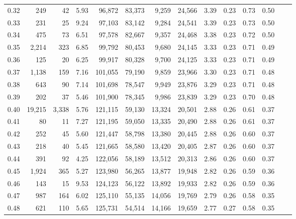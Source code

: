 \begin{tabular}{rrrrrrrrrrrrrr}
0.32 &     249 &     42 &    5.93 &   96,872 &   83,373 &   9,259 &  24,566 &  3.39 &  0.23 &  0.73 &      0.50 \\
0.33 &     231 &     25 &    9.24 &   97,103 &   83,142 &   9,284 &  24,541 &  3.39 &  0.23 &  0.73 &      0.50 \\
0.34 &     475 &     73 &    6.51 &   97,578 &   82,667 &   9,357 &  24,468 &  3.38 &  0.23 &  0.72 &      0.50 \\
0.35 &   2,214 &    323 &    6.85 &   99,792 &   80,453 &   9,680 &  24,145 &  3.33 &  0.23 &  0.71 &      0.49 \\
0.36 &     125 &     20 &    6.25 &   99,917 &   80,328 &   9,700 &  24,125 &  3.33 &  0.23 &  0.71 &      0.49 \\
0.37 &   1,138 &    159 &    7.16 &  101,055 &   79,190 &   9,859 &  23,966 &  3.30 &  0.23 &  0.71 &      0.48 \\
0.38 &     643 &     90 &    7.14 &  101,698 &   78,547 &   9,949 &  23,876 &  3.29 &  0.23 &  0.71 &      0.48 \\
0.39 &     202 &     37 &    5.46 &  101,900 &   78,345 &   9,986 &  23,839 &  3.29 &  0.23 &  0.70 &      0.48 \\
0.40 &  19,215 &  3,338 &    5.76 &  121,115 &   59,130 &  13,324 &  20,501 &  2.88 &  0.26 &  0.61 &      0.37 \\
0.41 &      80 &     11 &    7.27 &  121,195 &   59,050 &  13,335 &  20,490 &  2.88 &  0.26 &  0.61 &      0.37 \\
0.42 &     252 &     45 &    5.60 &  121,447 &   58,798 &  13,380 &  20,445 &  2.88 &  0.26 &  0.60 &      0.37 \\
0.43 &     218 &     40 &    5.45 &  121,665 &   58,580 &  13,420 &  20,405 &  2.87 &  0.26 &  0.60 &      0.37 \\
0.44 &     391 &     92 &    4.25 &  122,056 &   58,189 &  13,512 &  20,313 &  2.86 &  0.26 &  0.60 &      0.37 \\
0.45 &   1,924 &    365 &    5.27 &  123,980 &   56,265 &  13,877 &  19,948 &  2.82 &  0.26 &  0.59 &      0.36 \\
0.46 &     143 &     15 &    9.53 &  124,123 &   56,122 &  13,892 &  19,933 &  2.82 &  0.26 &  0.59 &      0.36 \\
0.47 &     987 &    164 &    6.02 &  125,110 &   55,135 &  14,056 &  19,769 &  2.79 &  0.26 &  0.58 &      0.35 \\
0.48 &     621 &    110 &    5.65 &  125,731 &   54,514 &  14,166 &  19,659 &  2.77 &  0.27 &  0.58 &      0.35 \\

\end{tabular}
